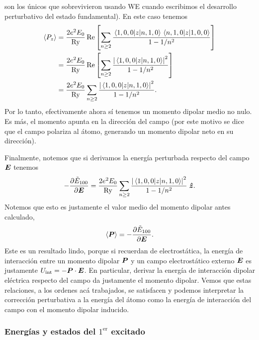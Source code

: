 \documentclass[10pt, a4paper]{article}
\newcommand{\Ry}{\ensuremath{\text{Ry}}}
\numberwithin{equation}{subsection}
\begin{document}
son los únicos que sobrevivieron usando WE cuando escribimos el desarrollo
perturbativo del estado fundamental). En este caso tenemos
\begin{align}
  \expval{P_z}
  &= \frac{2e^2E_0}{\Ry}\Re\left[
    \sum_{n \geq 2} \frac{\matrixel{1,0,0}{z}{n,1,0}\matrixel{n,1,0}{z}{1,0,0}}
    {1 - 1/n^2} \right] \nonumber \\
  &= \frac{2e^2E_0}{\Ry}\Re\left[
    \sum_{n \geq 2} \frac{\abs{\matrixel{1,0,0}{z}{n,1,0}}^2} {1 - 1/n^2}
    \right] \nonumber \\
  &= \frac{2e^2E_0}{\Ry} \sum_{n \geq 2}
    \frac{\abs{\matrixel{1,0,0}{z}{n,1,0}}^2} {1 - 1/n^2}.
\end{align}
Por lo tanto, efectivamente ahora sí tenemos un momento dipolar medio no nulo.
Es más, el momento apunta en la dirección del campo (por este motivo se dice
que el campo polariza al átomo, generando un momento dipolar neto en su
dirección).

\bigbreak

Finalmente, notemos que si derivamos la energía perturbada respecto del campo
$\vb*{E}$ tenemos
\begin{equation}
  -\pdv{\tilde{E}_{100}}{\vect{E}} = \frac{2e^2E_0}{\Ry} \sum_{n \geq 2}
    \frac{\abs{\matrixel{1,0,0}{z}{n,1,0}}^2} {1 - 1/n^2} \;\vers{z}.
\end{equation}
Notemos que esto es justamente el valor medio del momento dipolar antes
calculado,
\begin{equation}
  \expval{\vb*{P}} = -\pdv{\tilde{E}_{100}}{\vb*{E}}.
\end{equation}
Este es un resultado lindo, porque si recuerdan de electrostática, la energía
de interacción entre un momento dipolar $\vb*{P}$ y un campo electrostático
externo $\vb*{E}$ es justamente $U_{\text{int}} = -\vb*{P}\cdot\vb*{E}$. En
particular, derivar la energía de interacción dipolar eléctrica respecto del
campo da justamente el momento dipolar. Vemos que estas relaciones, a los
ordenes acá trabajados, se satisfacen y podemos interpretar la corrección
perturbativa a la energía del átomo como la energía de interacción del campo
con el momento dipolar inducido.

\subsubsection{Energías y estados del $1^{\text{er}}$ excitado}
\end{document}
